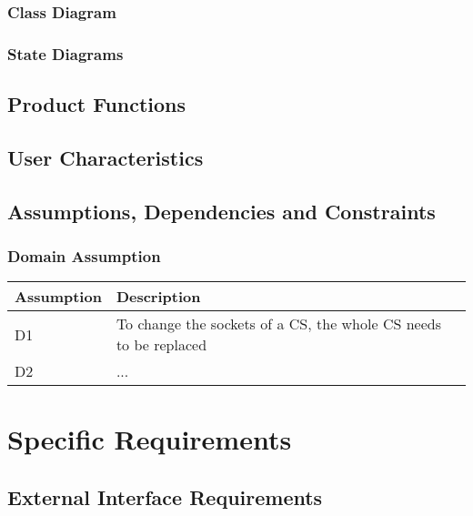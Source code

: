\documentclass[12pt]{article}
\begin{document}
\subsubsection{Class Diagram}

\subsubsection{State Diagrams}

\subsection{Product Functions}

\subsection{User Characteristics}

\subsection{Assumptions, Dependencies and Constraints}

\subsubsection{Domain Assumption}

\begin{table}[H]
    \centering
    \setlength{\tabcolsep}{18pt}
    \renewcommand{\arraystretch}{1.2}
    \begin{tabularx}{\textwidth}{|>{\centering\hsize=0.3\hsize}X|>{\hsize=1.7\hsize}X|}
        \hline
        \textbf{Assumption} & \textbf{Description} \\
        \hline
        D1 & To change the sockets of a CS, the whole CS needs to be replaced \\
        \hline
        D2 & ... \\
        \hline
    \end{tabularx}
    \label{tab:domain_assumptions}
\end{table}

\section{Specific Requirements}

\subsection{External Interface Requirements}
\end{document}

